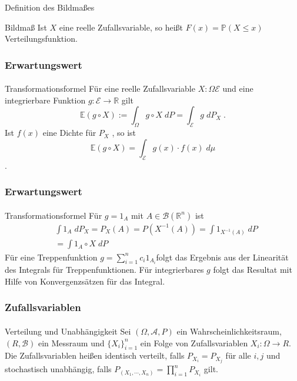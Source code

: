 \documentclass{beamer}
\begin{document}
\begin{frame}{Definition des Bildmaßes}

\begin{block}{Bildmaß}
    Ist $X$ eine reelle Zufallsvariable, so heißt 
    $F(x) = \mathbb{P}(X \leq x)$ Verteilungsfunktion.
\end{block}
\end{frame}




\begin{frame}
    \frametitle{Erwartungswert}
\framesubtitle{}
\begin{block}{Transformationsformel}
Für eine reelle Zufallsvariable $X:\mathcal{\Omega} \mathcal{E}$ und eine integrierbare Funktion $g:   \mathcal{E} \to \mathbb{R}$ gilt
$$ \mathbb{E} (g \circ X) := \int_{\Omega} g \circ X \; dP = \int_{\mathcal{E}}  g \; dP_X \;. $$
Ist $f(x)$ eine Dichte für $P_X$ , so ist  
$$\mathbb{E} (g \circ X) =  \int_{\mathcal{E}} g(x) \cdot f(x) \; d\mu$$.
\end{block}
 \end{frame}

 \begin{frame}
    \frametitle{Erwartungswert}
\framesubtitle{}
\begin{block}{Transformationsformel}
Für $g = 1_A$ mit $A \in \mathcal{B}(\mathbb{R}^n)$ ist
\begin{align*}
& \int 1_A \; dP_X = P_X(A) = P(X^{-1} (A)) = \int 1_{X^{-1}(A)} \; dP \\
&= \int 1_{A} \circ X \; dP
\end{align*}
Für eine Treppenfunktion $g= \sum_{i= 1}^n c_i 1_{A_i} $folgt das Ergebnis aus der Linearität des Integrals  für Treppenfunktionen. Für integrierbares $g$ folgt das Resultat mit Hilfe von Konvergenzsätzen für das  Integral.
\end{block}
 \end{frame}



\begin{frame}
    \frametitle{Zufallsvariablen}
\framesubtitle{}
\begin{block}{Verteilung und Unabhängigkeit}
Sei $(\Omega, \mathcal{A}, P)$ ein Wahrscheinlichkeitsraum, $(R, \mathcal{B})$ ein Messraum  und
 $\{X_i\}_{i=1}^n$ ein Folge von Zufallsvariablen   $X_i :  \Omega \to R$.
Die Zufallsvariablen heißen identisch verteilt, falls
 $P_{X_i} = P_{X_j}$ für alle $i,j$  und
stochastisch unabhängig, falls
 $P_{(X_1, \cdots ,X_n)} = \prod_{i=1}^n P_{X_i}$ gilt. 
\end{block}
 \end{frame}
\end{document}
